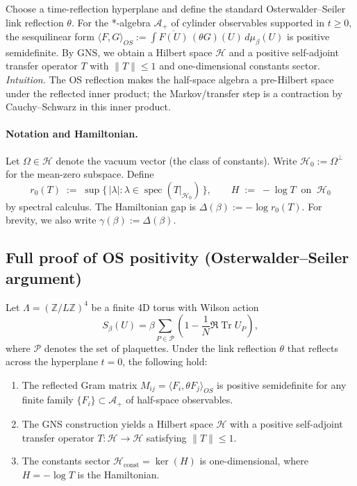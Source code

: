 \documentclass[11pt]{amsart}
\begin{document}
Choose a time-reflection hyperplane and define the standard Osterwalder--Seiler link reflection $\theta$. For the *-algebra $\mathcal A_+$ of cylinder observables supported in $t\ge 0$, the sesquilinear form $\langle F,G\rangle_{OS}:=\int \overline{F(U)}\,(\theta G)(U)\, d\mu_{\beta}(U)$ is positive semidefinite. By GNS, we obtain a Hilbert space $\mathcal H$ and a positive self-adjoint transfer operator $T$ with $\lVert T\rVert\le 1$ and one-dimensional constants sector.
\smallskip
\noindent\emph{Intuition.} The OS reflection makes the half-space algebra a pre-Hilbert space under the reflected inner product; the Markov/transfer step is a contraction by Cauchy–Schwarz in this inner product.

\paragraph{Notation and Hamiltonian.}
Let $\Omega\in\mathcal H$ denote the vacuum vector (the class of constants). Write $\mathcal H_0:=\Omega^{\perp}$ for the mean-zero subspace. Define
\[
  r_0(T)\;:=\; \sup\{\,|\lambda| : \lambda\in\operatorname{spec}(T|_{\mathcal H_0})\,\},\qquad
  H\;:=\;-\log T\ \text{ on }\ \mathcal H_0
\]
by spectral calculus. The Hamiltonian gap is $\Delta(\beta):=-\log r_0(T)$.
For brevity, we also write $\gamma(\beta):=\Delta(\beta)$.

\subsection*{Full proof of OS positivity (Osterwalder--Seiler argument)}

\begin{theorem}\label{thm:os-wilson-detailed}
Let $\Lambda = (\mathbb{Z}/L\mathbb{Z})^4$ be a finite 4D torus with Wilson action
\[
  S_\beta(U) = \beta \sum_{P \in \mathcal{P}} \left(1 - \frac{1}{N} \Re \operatorname{Tr} U_P\right),
\]
where $\mathcal{P}$ denotes the set of plaquettes. Under the link reflection $\theta$ that reflects across the hyperplane $t = 0$, the following hold:
\begin{enumerate}
  \item The reflected Gram matrix $M_{ij} = \langle F_i, \theta F_j \rangle_{OS}$ is positive semidefinite for any finite family $\{F_i\} \subset \mathcal{A}_+$ of half-space observables.
  \item The GNS construction yields a Hilbert space $\mathcal{H}$ with a positive self-adjoint transfer operator $T: \mathcal{H} \to \mathcal{H}$ satisfying $\|T\| \le 1$.
  \item The constants sector $\mathcal{H}_{\text{const}} = \ker(H)$ is one-dimensional, where $H = -\log T$ is the Hamiltonian.
\end{enumerate}
\end{theorem}
\end{document}
